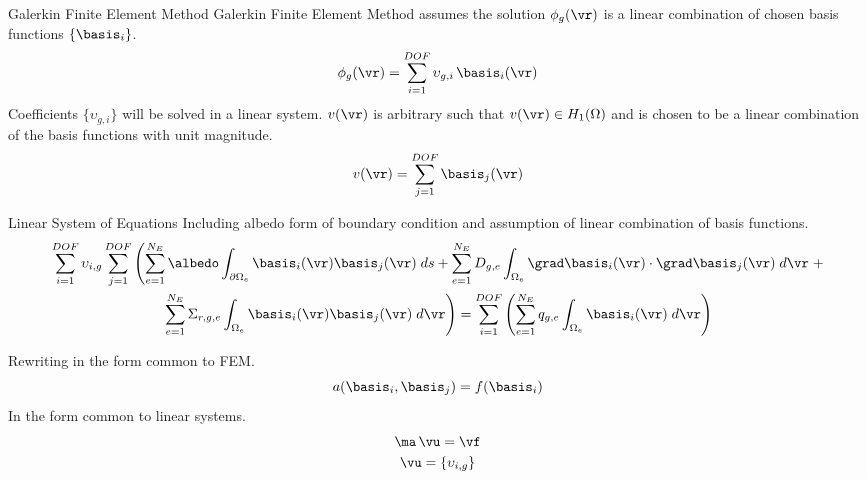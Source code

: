 \begin{frame}{Galerkin Finite Element Method}
  Galerkin Finite Element Method assumes the solution $\phi_g(\vr)$ is a linear
  combination of chosen basis functions $\{\basis_i\}$.
  \begin{equation} 
    \label{eq:linear_combination}
    \phi_g(\vr) = \sum_{i=1}^{DOF} \upsilon_{g,i} \, \basis_i(\vr)
  \end{equation}
  Coefficients $\{\upsilon_{g,i}\}$ will be solved in a linear system.
  $v(\vr)$ is arbitrary such that $v(\vr) \in H_1(\Omega)$ and is chosen to be a
  linear combination of the basis functions with unit magnitude.
  \begin{equation} 
    \label{eq:linear_superposition}
    v(\vr) = \sum_{j=1}^{DOF} \basis_j(\vr)
  \end{equation}
\end{frame}

\begin{frame}{Linear System of Equations}
  Including albedo form of boundary condition and assumption of linear
  combination of basis functions.
  \begin{multline}
    \label{eq:linear_equation}
    \sum_{i=1}^{DOF} \upsilon_{i,g} \sum_{j=1}^{DOF} \left(
      \sum_{e=1}^{N_E} \albedo \int_{\partial \Omega_e}
      \basis_i(\vr)  \basis_j(\vr) \;ds +
      \sum_{e=1}^{N_E} D_{g,e} 
      \int_{\Omega_e} \grad \basis_i(\vr) \cdot \grad \basis_j(\vr)\;d\vr
      \right.
      + \\
      \left.
      \sum_{e=1}^{N_E} \Sigma_{r,g,e}
      \int_{\Omega_e} \basis_i(\vr) \basis_j(\vr) \; d\vr \right) =
      \sum_{i=1}^{DOF} \left(
      \sum_{e=1}^{N_E} q_{g,e} 
      \int_{\Omega_e} \basis_i(\vr) \; d\vr \right)
  \end{multline}

  Rewriting in the form common to FEM.
  \begin{equation}
    \label{eq:fem_notation}
    a(\basis_i,\basis_j) = f(\basis_i)
  \end{equation}
  In the form common to linear systems.
  \begin{gather}
    \label{eq:matrix_notation}
    \ma \, \vu = \vf \\
    \vu = \{\upsilon_{i,g}\}
  \end{gather}
\end{frame}


